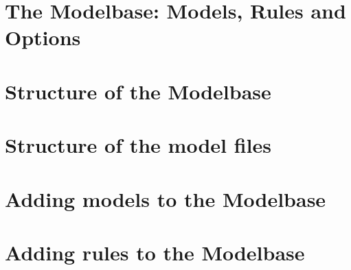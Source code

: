 \documentclass[11pt,a4paper]{article}
\begin{document}
\section{The Modelbase: Models, Rules and Options}\label{sec:usingMMB}
\vspace{0.5cm}


\section{Structure of the Modelbase}
\label{sec:MMBstructure}
\vspace{0.5cm}


\section{Structure of the model files}\label{sec:ModelfileStructure}
\vspace{0.5cm}


\section{Adding models to the Modelbase}%
\vspace{0.5cm}



\section{Adding rules to the Modelbase}\label{sec:HowToAddRules}
\vspace{0.5cm}






\end{document}
